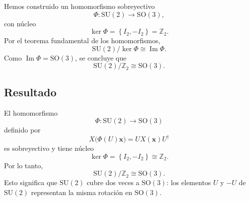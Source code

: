 \documentclass[11pt,a4paper]{article}
\newcommand{\SU}{\mathrm{SU}}
\newcommand{\SO}{\mathrm{SO}}
\newcommand{\im}{\operatorname{Im}}
\newcommand{\kerp}{\operatorname{ker}}
\newcommand{\vect}[1]{\boldsymbol{#1}}
\newcommand{\set}[1]{\left\{#1\right\}}
\begin{document}
Hemos construido un homomorfismo sobreyectivo
\[
\Phi:\SU(2)\longrightarrow\SO(3),
\]
con núcleo
\[
\kerp\Phi=\set{I_2,-I_2}=\mathbb{Z}_2.
\]
Por el teorema fundamental de los homomorfismos,
\[
\SU(2)/\kerp\Phi\cong\im\Phi.
\]
Como $\im\Phi=\SO(3)$, se concluye que
\[
\SU(2)/\mathbb{Z}_2\cong\SO(3).
\]

\subsection*{Resultado}

El homomorfismo
\[
\Phi:\SU(2)\longrightarrow\SO(3)
\]
definido por
\[
X\bigl(\Phi(U)\vect x\bigr)=UX(\vect x)U^\dagger
\]
es sobreyectivo y tiene núcleo
\[
\kerp\Phi=\set{I_2,-I_2}\cong\mathbb{Z}_2.
\]
Por lo tanto,
\[
\SU(2)/\mathbb{Z}_2\cong\SO(3).
\]
Esto significa que $\SU(2)$ cubre dos veces a $\SO(3)$: los elementos $U$ y $-U$ de $\SU(2)$ representan la misma rotación en $\SO(3)$.
\end{document}
